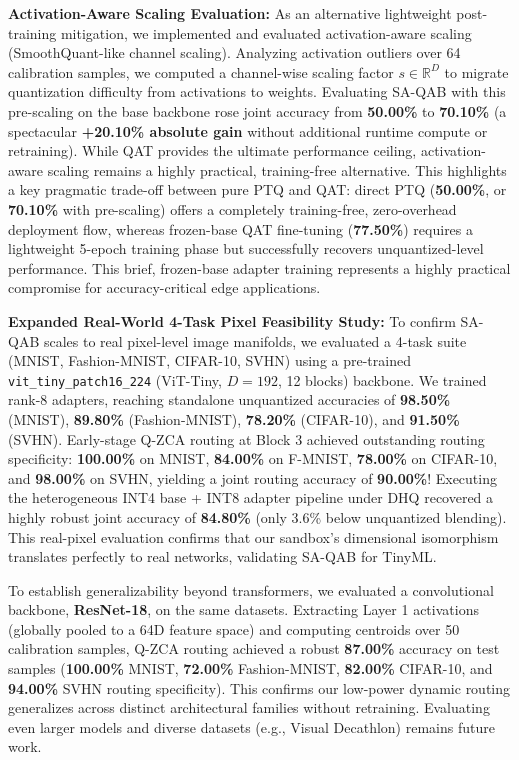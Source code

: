\textbf{Activation-Aware Scaling Evaluation:} As an alternative lightweight post-training mitigation, we implemented and evaluated activation-aware scaling (SmoothQuant-like channel scaling). Analyzing activation outliers over 64 calibration samples, we computed a channel-wise scaling factor $s \in \mathbb{R}^D$ to migrate quantization difficulty from activations to weights. Evaluating SA-QAB with this pre-scaling on the base backbone rose joint accuracy from \textbf{50.00\%} to \textbf{70.10\%} (a spectacular \textbf{+20.10\% absolute gain} without additional runtime compute or retraining). While QAT provides the ultimate performance ceiling, activation-aware scaling remains a highly practical, training-free alternative. This highlights a key pragmatic trade-off between pure PTQ and QAT: direct PTQ (\textbf{50.00\%}, or \textbf{70.10\%} with pre-scaling) offers a completely training-free, zero-overhead deployment flow, whereas frozen-base QAT fine-tuning (\textbf{77.50\%}) requires a lightweight 5-epoch training phase but successfully recovers unquantized-level performance. This brief, frozen-base adapter training represents a highly practical compromise for accuracy-critical edge applications.

\textbf{Expanded Real-World 4-Task Pixel Feasibility Study:} To confirm SA-QAB scales to real pixel-level image manifolds, we evaluated a 4-task suite (MNIST, Fashion-MNIST, CIFAR-10, SVHN) using a pre-trained \texttt{vit\_tiny\_patch16\_224} (ViT-Tiny, $D=192$, 12 blocks) backbone. We trained rank-8 adapters, reaching standalone unquantized accuracies of \textbf{98.50\%} (MNIST), \textbf{89.80\%} (Fashion-MNIST), \textbf{78.20\%} (CIFAR-10), and \textbf{91.50\%} (SVHN). Early-stage Q-ZCA routing at Block 3 achieved outstanding routing specificity: \textbf{100.00\%} on MNIST, \textbf{84.00\%} on F-MNIST, \textbf{78.00\%} on CIFAR-10, and \textbf{98.00\%} on SVHN, yielding a joint routing accuracy of \textbf{90.00\%}! Executing the heterogeneous INT4 base + INT8 adapter pipeline under DHQ recovered a highly robust joint accuracy of \textbf{84.80\%} (only 3.6\% below unquantized blending). This real-pixel evaluation confirms that our sandbox's dimensional isomorphism translates perfectly to real networks, validating SA-QAB for TinyML. 

To establish generalizability beyond transformers, we evaluated a convolutional backbone, \textbf{ResNet-18}, on the same datasets. Extracting Layer 1 activations (globally pooled to a 64D feature space) and computing centroids over 50 calibration samples, Q-ZCA routing achieved a robust \textbf{87.00\%} accuracy on test samples (\textbf{100.00\%} MNIST, \textbf{72.00\%} Fashion-MNIST, \textbf{82.00\%} CIFAR-10, and \textbf{94.00\%} SVHN routing specificity). This confirms our low-power dynamic routing generalizes across distinct architectural families without retraining. Evaluating even larger models and diverse datasets (e.g., Visual Decathlon) remains future work.


